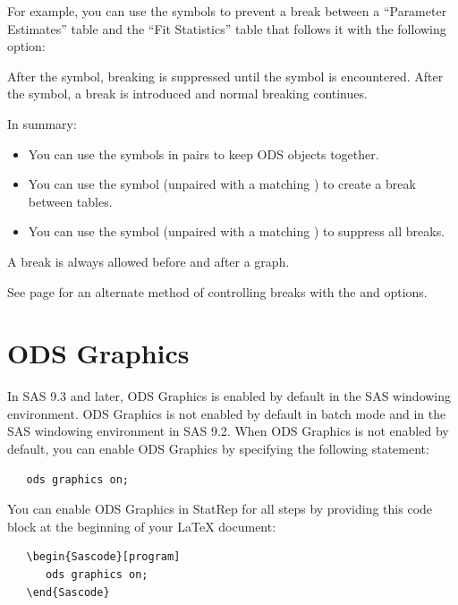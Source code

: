 \documentclass[article,oneside]{memoir}
\newcommand*{\StatRep}{\textsf{StatRep}\xspace}
\begin{document}
  For example, you can use the symbols to prevent a break between a
  ``Parameter Estimates'' table and the ``Fit Statistics'' table that follows it
  with the following option:

  After the \Code{<} symbol, breaking is suppressed until the \Code{>} symbol is encountered.
  After the \Code{>} symbol, a break is introduced and normal breaking continues.

  In summary:
  \begin{itemize}
  \item You can use the \Code{<>} symbols in pairs to keep ODS objects together.
  \item You can use the \Code{>} symbol (unpaired with a matching \Code{<}) to create a break between tables.
  \item You can use the \Code{<} symbol (unpaired with a matching \Code{>}) to suppress all breaks.
  \end{itemize}

  A break is always allowed before and after a graph.

  See page \pageref{skiplast} for an alternate method of controlling breaks
  with the  and  options.

 \chapter{ODS Graphics}

 In SAS 9.3 and later, ODS Graphics is enabled by default in the SAS windowing environment.
 ODS Graphics is not enabled by default in batch mode and in the SAS windowing environment in SAS 9.2.
 When ODS Graphics is not enabled by default, you can enable ODS Graphics by specifying the following statement:

\begin{snugshade}
\begin{verbatim}
   ods graphics on;
\end{verbatim}
\end{snugshade}


You can enable ODS Graphics in \StatRep for all steps by providing this code block at the
beginning of your LaTeX document:

\begin{snugshade}
\begin{verbatim}
   \begin{Sascode}[program]
      ods graphics on;
   \end{Sascode}
\end{verbatim}
\end{snugshade}
\end{document}
